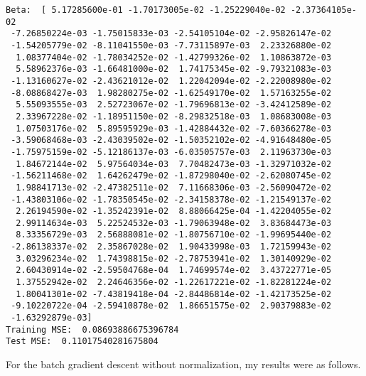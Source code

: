 \documentclass[12pt]{article}
\begin{document}
\scriptsize
\begin{verbatim}
Beta:  [ 5.17285600e-01 -1.70173005e-02 -1.25229040e-02 -2.37364105e-02
 -7.26850224e-03 -1.75015833e-03 -2.54105104e-02 -2.95826147e-02
 -1.54205779e-02 -8.11041550e-03 -7.73115897e-03  2.23326880e-02
  1.08377404e-02 -1.78034252e-02 -1.42799326e-02  1.10863872e-03
  5.58962376e-03 -1.66481000e-02  1.74175345e-02 -9.79321083e-03
 -1.13160627e-02 -2.43621012e-02  1.22042094e-02 -2.22008980e-02
 -8.08868427e-03  1.98280275e-02 -1.62549170e-02  1.57163255e-02
  5.55093555e-03  2.52723067e-02 -1.79696813e-02 -3.42412589e-02
  2.33967228e-02 -1.18951150e-02 -8.29832518e-03  1.08683008e-03
  1.07503176e-02  5.89595929e-03 -1.42884432e-02 -7.60366278e-03
 -3.59068468e-03 -2.43039502e-02 -1.50352102e-02 -4.91648480e-05
 -1.75975159e-02 -5.12186137e-03 -6.03505757e-03  2.11963730e-03
  1.84672144e-02  5.97564034e-03  7.70482473e-03 -1.32971032e-02
 -1.56211468e-02  1.64262479e-02 -1.87298040e-02 -2.62080745e-02
  1.98841713e-02 -2.47382511e-02  7.11668306e-03 -2.56090472e-02
 -1.43803106e-02 -1.78350545e-02 -2.34158378e-02 -1.21549137e-02
  2.26194590e-02 -1.35242391e-02  8.88066425e-04 -1.42204055e-02
  2.99114634e-03  5.22524532e-03 -1.79063948e-02  3.83684473e-03
  8.33356729e-03  2.56888081e-02 -1.80756710e-02 -1.99695440e-02
 -2.86138337e-02  2.35867028e-02  1.90433998e-03  1.72159943e-02
  3.03296234e-02  1.74398815e-02 -2.78753941e-02  1.30140929e-02
  2.60430914e-02 -2.59504768e-04  1.74699574e-02  3.43722771e-05
  1.37552942e-02  2.24646356e-02 -1.22617221e-02 -1.82281224e-02
  1.80041301e-02 -7.43819418e-04 -2.84486814e-02 -1.42173525e-02
 -9.10220722e-04 -2.59410878e-02  1.86651575e-02  2.90379883e-02
 -1.63292879e-03]
Training MSE:  0.08693886675396784
Test MSE:  0.11017540281675804
\end{verbatim}
\normalsize
For the batch gradient descent without normalization, my results were as follows.
\scriptsize
\end{document}
